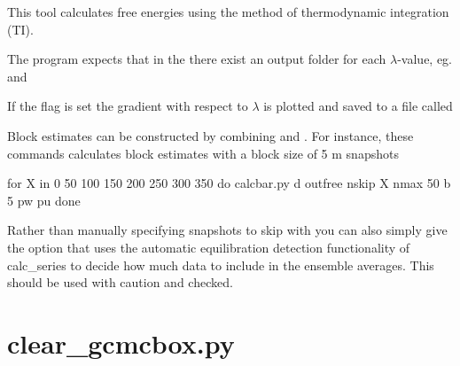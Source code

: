 \documentclass[letterpaper,10pt,english]{sphinxmanual}
\begin{document}

%
\begin{sphinxVerbatim}[commandchars=\\\{\}]
  
  
  
   
\end{sphinxVerbatim}


This tool calculates free energies using the method of thermodynamic integration (TI).

The program expects that in the  there exist an output folder for each \(\lambda\)-value, eg.  and 

If the  flag is set the gradient with respect to \(\lambda\) is plotted and saved to a file called 

Block estimates can be constructed by combining  and . For instance, these commands calculates block estimates with a block size of 5 m snapshots

%
\begin{sphinxVerbatim}[commandchars=\\\{\}]
for X in 0 50 100 150 200 250 300 350
do
calc\PYGZus{}bar.py \PYGZhy{}d out\PYGZus{}free \PYGZhy{}nskip \PYGZdl{}X \PYGZhy{}nmax 50 \PYGZhy{}b 5 \PYGZhy{}pw \PYGZhy{}pu
done
\end{sphinxVerbatim}

Rather than manually specifying snapshots to skip with  you can also simply give the  option that uses the automatic equilibration detection functionality of calc\_series to decide how much data to include in the ensemble averages. This should be used with caution and checked.


\section{clear\_gcmcbox.py}
\label{\detokenize{tools:clear-gcmcbox-py}}
\end{document}
